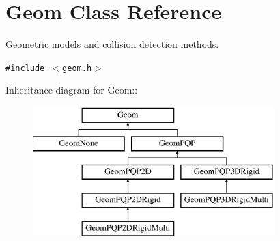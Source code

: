 \section{Geom  Class Reference}
\label{classGeom}
Geometric models and collision detection methods. 


{\tt \#include $<$geom.h$>$}

Inheritance diagram for Geom::\begin{figure}[H]
\begin{center}
\leavevmode
\includegraphics[height=5cm]{classGeom}
\end{center}
\end{figure}
